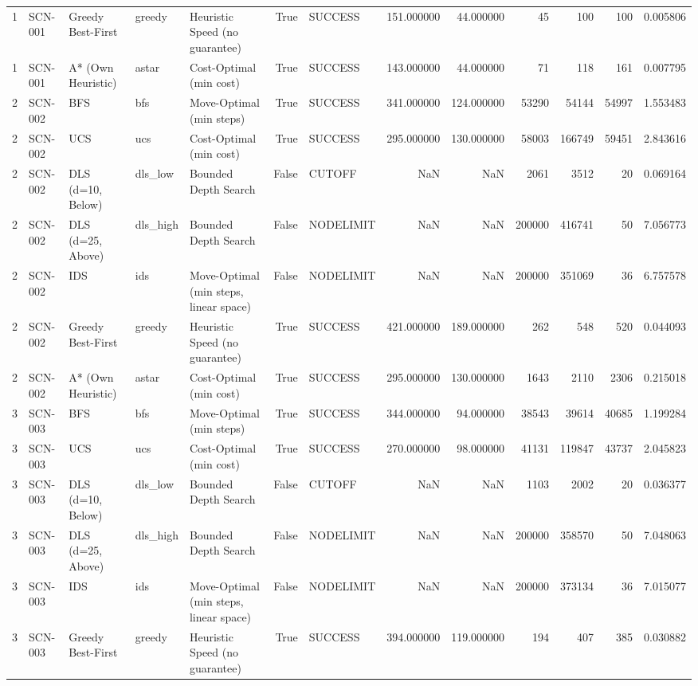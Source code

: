 \begin{table}[htbp]
\begin{tabular}{rllllrlrrrrrr}
1 & SCN-001 & Greedy Best-First & greedy & Heuristic Speed (no guarantee) & True & SUCCESS & 151.000000 & 44.000000 & 45 & 100 & 100 & 0.005806 \\
1 & SCN-001 & A* (Own Heuristic) & astar & Cost-Optimal (min cost) & True & SUCCESS & 143.000000 & 44.000000 & 71 & 118 & 161 & 0.007795 \\
2 & SCN-002 & BFS & bfs & Move-Optimal (min steps) & True & SUCCESS & 341.000000 & 124.000000 & 53290 & 54144 & 54997 & 1.553483 \\
2 & SCN-002 & UCS & ucs & Cost-Optimal (min cost) & True & SUCCESS & 295.000000 & 130.000000 & 58003 & 166749 & 59451 & 2.843616 \\
2 & SCN-002 & DLS (d=10, Below) & dls\_low & Bounded Depth Search & False & CUTOFF & NaN & NaN & 2061 & 3512 & 20 & 0.069164 \\
2 & SCN-002 & DLS (d=25, Above) & dls\_high & Bounded Depth Search & False & NODELIMIT & NaN & NaN & 200000 & 416741 & 50 & 7.056773 \\
2 & SCN-002 & IDS & ids & Move-Optimal (min steps, linear space) & False & NODELIMIT & NaN & NaN & 200000 & 351069 & 36 & 6.757578 \\
2 & SCN-002 & Greedy Best-First & greedy & Heuristic Speed (no guarantee) & True & SUCCESS & 421.000000 & 189.000000 & 262 & 548 & 520 & 0.044093 \\
2 & SCN-002 & A* (Own Heuristic) & astar & Cost-Optimal (min cost) & True & SUCCESS & 295.000000 & 130.000000 & 1643 & 2110 & 2306 & 0.215018 \\
3 & SCN-003 & BFS & bfs & Move-Optimal (min steps) & True & SUCCESS & 344.000000 & 94.000000 & 38543 & 39614 & 40685 & 1.199284 \\
3 & SCN-003 & UCS & ucs & Cost-Optimal (min cost) & True & SUCCESS & 270.000000 & 98.000000 & 41131 & 119847 & 43737 & 2.045823 \\
3 & SCN-003 & DLS (d=10, Below) & dls\_low & Bounded Depth Search & False & CUTOFF & NaN & NaN & 1103 & 2002 & 20 & 0.036377 \\
3 & SCN-003 & DLS (d=25, Above) & dls\_high & Bounded Depth Search & False & NODELIMIT & NaN & NaN & 200000 & 358570 & 50 & 7.048063 \\
3 & SCN-003 & IDS & ids & Move-Optimal (min steps, linear space) & False & NODELIMIT & NaN & NaN & 200000 & 373134 & 36 & 7.015077 \\
3 & SCN-003 & Greedy Best-First & greedy & Heuristic Speed (no guarantee) & True & SUCCESS & 394.000000 & 119.000000 & 194 & 407 & 385 & 0.030882 \\

\end{tabular}
\end{table}
